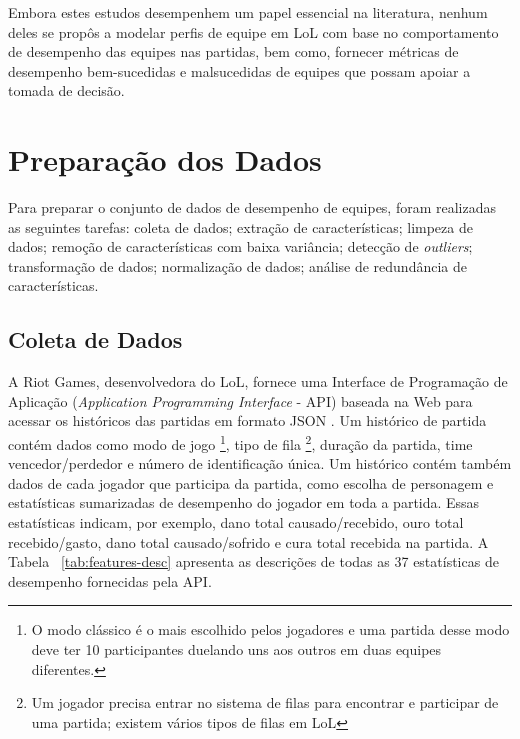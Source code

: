 Embora estes estudos desempenhem um papel essencial na literatura, nenhum deles se propôs a modelar perfis de equipe em LoL com base no comportamento de desempenho das equipes nas partidas, bem como, fornecer métricas de desempenho bem-sucedidas e malsucedidas de equipes que possam apoiar a tomada de decisão.

\chapter{Preparação dos Dados}
Para preparar o conjunto de dados de desempenho de equipes, foram realizadas as seguintes tarefas: coleta de dados; extração de características; limpeza de dados; remoção de características com baixa variância; detecção de \textit{outliers}; transformação de dados; normalização de dados; análise de redundância de características.

\section{Coleta de Dados}
A Riot Games, desenvolvedora do LoL, fornece uma Interface de Programação de Aplicação (\textit{Application Programming Interface} - API) baseada na Web para acessar os históricos das partidas em formato JSON \cite{riot1}. Um histórico de partida contém dados como modo de jogo \footnote{O modo clássico é o mais escolhido pelos jogadores e uma partida desse modo deve ter 10 participantes duelando uns aos outros em duas equipes diferentes.}, tipo de fila \footnote{Um jogador precisa entrar no sistema de filas para encontrar e participar de uma partida; existem vários tipos de filas em LoL}, duração da partida, time vencedor/perdedor e número de identificação única. Um histórico contém também dados de cada jogador que participa da partida, como escolha de personagem e estatísticas sumarizadas de desempenho do jogador em toda a partida. Essas estatísticas indicam, por exemplo, dano total causado/recebido, ouro total recebido/gasto, dano total causado/sofrido e cura total recebida na partida. A Tabela ~\ref{tab:features-desc} apresenta as descrições de todas as 37 estatísticas de desempenho fornecidas pela API.

